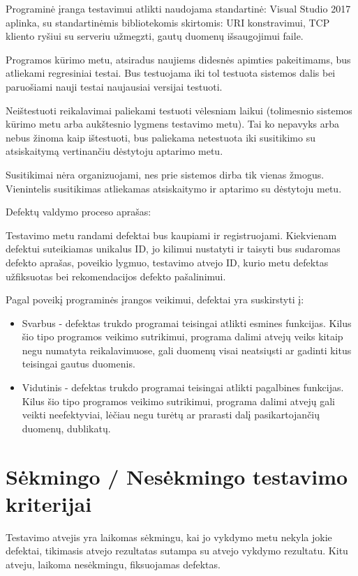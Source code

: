 Programinė įranga testavimui atlikti naudojama standartinė: Visual Studio 2017 aplinka, su standartinėmis bibliotekomis skirtomis: URI konstravimui, TCP kliento ryšiui su serveriu užmegzti, gautų duomenų išsaugojimui faile. 

Programos kūrimo metu, atsiradus naujiems didesnės apimties pakeitimams, bus atliekami regresiniai testai. 
Bus testuojama iki tol testuota sistemos dalis bei paruošiami nauji testai naujausiai versijai testuoti. 

Neištestuoti reikalavimai paliekami testuoti vėlesniam laikui (tolimesnio sistemos kūrimo metu arba aukštesnio lygmens testavimo metu). 
Tai ko nepavyks arba nebus žinoma kaip ištestuoti, bus paliekama netestuota iki susitikimo su atsiskaitymą vertinančiu dėstytoju aptarimo metu. 

Susitikimai nėra organizuojami, nes prie sistemos dirba tik vienas žmogus. 
Vienintelis susitikimas atliekamas atsiskaitymo ir aptarimo su dėstytoju metu.

Defektų valdymo proceso aprašas:

Testavimo metu randami defektai bus kaupiami ir registruojami. 
Kiekvienam defektui suteikiamas unikalus ID, jo kilimui nustatyti ir taisyti bus sudaromas defekto aprašas, poveikio lygmuo, testavimo atvejo ID, kurio metu defektas užfiksuotas bei rekomendacijos defekto pašalinimui.

Pagal poveikį programinės įrangos veikimui, defektai yra suskirstyti į:

\begin{itemize}
	\item Svarbus - defektas trukdo programai teisingai atlikti esmines funkcijas. Kilus šio tipo programos
	veikimo sutrikimui, programa dalimi atvejų veiks kitaip negu numatyta reikalavimuose,
	gali duomenų visai neatsiųsti ar gadinti kitus teisingai gautus duomenis.
	\item Vidutinis - defektas trukdo programai teisingai atlikti pagalbines funkcijas. Kilus šio tipo
	programos veikimo sutrikimui, programa dalimi atvejų gali veikti neefektyviai, lėčiau negu
	turėtų ar prarasti dalį pasikartojančių duomenų, dublikatų.
\end{itemize}

\section{Sėkmingo / Nesėkmingo testavimo kriterijai}

Testavimo atvejis yra laikomas sėkmingu, kai jo vykdymo metu nekyla jokie defektai, tikimasis atvejo rezultatas sutampa su atvejo vykdymo rezultatu. 
Kitu atveju, laikoma nesėkmingu, fiksuojamas defektas.

